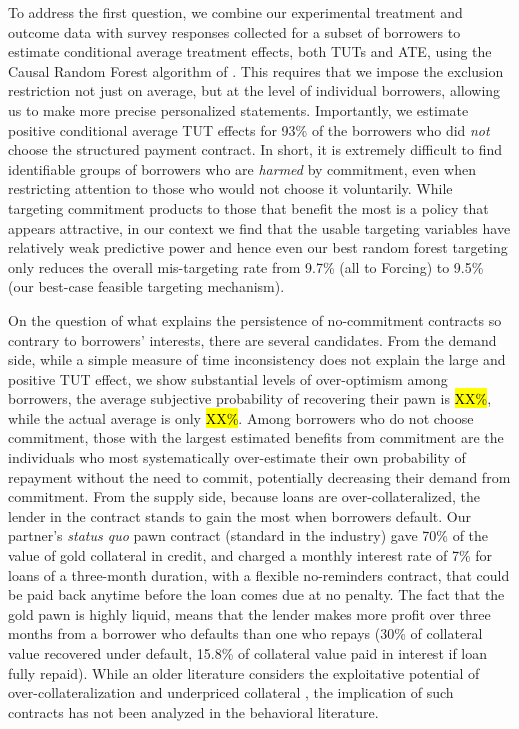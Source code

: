 \documentclass[12pt, a4paper]{article}
\begin{document}
To address the first question, we combine our experimental treatment and outcome data with survey responses collected for a subset of borrowers to estimate conditional average treatment effects, both TUTs and ATE, using the Causal Random Forest algorithm of \cite{atheygrf}. This requires that we impose the exclusion restriction not just on average, but at the level of individual borrowers, allowing us to make more precise personalized statements. Importantly, we estimate positive conditional average TUT effects for 93\% of the borrowers who did \textit{not} choose the structured payment contract. 
In short, it is extremely difficult to find identifiable groups of borrowers who are \emph{harmed} by commitment, even when restricting attention to those who would not choose it voluntarily. 
While targeting commitment products to those that benefit the most is a policy that appears attractive, in our context we find that the usable targeting variables have relatively weak predictive power and hence even our best random forest targeting only reduces the overall mis-targeting rate from 9.7\% (all to Forcing) to 9.5\% (our best-case feasible targeting mechanism).

On the question of what explains the persistence of no-commitment contracts so contrary to borrowers’ interests, there are several candidates. From the demand side, while a simple measure of time inconsistency does not explain the large and positive TUT effect, we show substantial levels of over-optimism among borrowers, the average subjective probability of recovering their pawn is \hl{XX\%}, while the actual average is only \hl{XX\%}. Among borrowers who do not choose commitment, those with the largest estimated benefits from commitment are the individuals who most systematically over-estimate their own probability of repayment without the need to commit, potentially decreasing their demand from commitment. From the supply side, because loans are over-collateralized, the lender in the contract stands to gain the most when borrowers default.  Our partner's \emph{status quo} pawn contract (standard in the industry) gave 70\% of the value of gold collateral in credit, and charged a monthly interest rate of 7\% for loans of a three-month duration, with a flexible no-reminders contract, that could be paid back anytime before the loan comes due at no penalty. The fact that the gold pawn is highly liquid, means that the lender makes more profit over three months from a borrower who defaults than one who repays (30\% of collateral value recovered under default, 15.8\% of collateral value paid in interest if loan fully repaid). While an older literature considers the exploitative potential of over-collateralization and underpriced collateral \citep{basu1984implicit}, the implication of such contracts has not been analyzed in the behavioral literature. 
\end{document}
